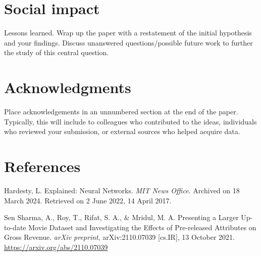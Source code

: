 \documentclass{article}
\begin{document}
\section{Social impact}
\label{conclusion}

Lessons learned.  Wrap up the paper with a restatement of the initial hypothesis
and your findings.  Discuss unanswered questions/possible future work to further
the study of this central question.

\section*{Acknowledgments}


Place acknowledgements in an unnumbered section at the
end of the paper. Typically, this will include
to colleagues who contributed to the ideas, individuals who
reviewed your submission, or external sources who helped
acquire data.

\section*{References}
\begin{hangparas}{.25in}{1} %
\hypertarget{Hardesty2017}{Hardesty, L. Explained: Neural Networks. \textit{MIT News Office}. Archived on 18 March 2024. Retrieved on 2 June 2022, 14 April 2017.}
\end{hangparas}
\begin{hangparas}{.25in}{1}
\hypertarget{SenSharma2021}{Sen Sharma, A., Roy, T., Rifat, S. A., \& Mridul, M. A. Presenting a Larger Up-to-date Movie Dataset and Investigating the Effects of Pre-released Attributes on Gross Revenue. \textit{arXiv preprint}, arXiv:2110.07039 [cs.IR], 13 October 2021. \url{https://arxiv.org/abs/2110.07039}}

\end{hangparas}



\end{document}
